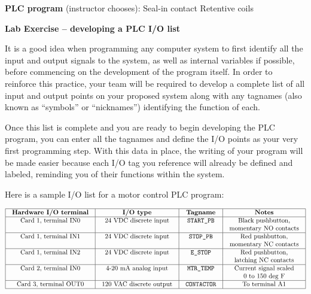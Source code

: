 \vskip 20pt

\noindent
{\bf PLC program} (instructor chooses): \hskip 20pt \underbar{\hskip 20pt} Seal-in contact \hskip 20pt \underbar{\hskip 20pt} Retentive coils



\vfil







\vfil \eject

\noindent
{\bf Lab Exercise -- developing a PLC I/O list}

\vskip 5pt

It is a good idea when programming any computer system to first identify all the input and output signals to the system, as well as internal variables if possible, before commencing on the development of the program itself.  In order to reinforce this practice, your team will be required to develop a complete list of all input and output points on your proposed system along with any tagnames (also known as ``symbols'' or ``nicknames'') identifying the function of each.

Once this list is complete and you are ready to begin developing the PLC program, you can enter all the tagnames and define the I/O points as your very first programming step.  With this data in place, the writing of your program will be made easier because each I/O tag you reference will already be defined and labeled, reminding you of their functions within the system.

\vskip 10pt

Here is a sample I/O list for a motor control PLC program:


$$\vbox{\offinterlineskip
\halign{\strut
\vrule \quad\hfil # \ \hfil & 
\vrule \quad\hfil # \ \hfil & 
\vrule \quad\hfil # \ \hfil & 
\vrule \quad\hfil # \ \hfil \vrule \cr
\noalign{\hrule}
%
{\bf Hardware I/O terminal} & {\bf I/O type} & {\bf Tagname} & {\bf Notes} \cr
%
\noalign{\hrule}
%
Card 1, terminal IN0 & 24 VDC discrete input & {\tt START\_PB} & Black pushbutton, \cr
 &  &  & momentary NO contacts \cr
%
\noalign{\hrule}
%
Card 1, terminal IN1 & 24 VDC discrete input & {\tt STOP\_PB} & Red pushbutton, \cr
 &  &  & momentary NC contacts \cr
%
\noalign{\hrule}
%
Card 1, terminal IN2 & 24 VDC discrete input & {\tt E\_STOP} & Red pushbutton, \cr
 &  &  & latching NC contacts \cr
%
\noalign{\hrule}
%
Card 2, terminal IN0 & 4-20 mA analog input & {\tt MTR\_TEMP} & Current signal scaled \cr
 &  &  & 0 to 150 deg F \cr
%
\noalign{\hrule}
%
Card 3, terminal OUT0 & 120 VAC discrete output & {\tt CONTACTOR} & To terminal A1 \cr
%
\noalign{\hrule}
} %
}$$ %








